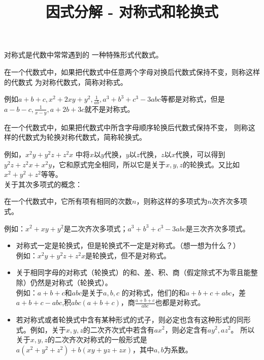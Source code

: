 \documentclass[windows,csize4,answers]{BHCexam}
\title{因式分解 - 对称式和轮换式}
\begin{document}
\maketitle

\begin{groups}
    对称式是代数中常常遇到的 一种特殊形式代数式。\\
    \fbox
    {
        \parbox{\textwidth}
        {
            在一个代数式中，如果把代数式中任意两个字母对换后代数式保持不变，则称这样的代数式
            为对称代数式，简称对称式。
        }
    }
    例如$a+b+c,x^2+2xy+y^2,\frac{1}{ab},a^3+b^3+c^3-3abc$等都是对称式，但是
    $a-b-c,\frac{1}{x-y},a+2b+3c$就不是对称式。 \\

    \fbox
    {
        \parbox{\textwidth}
        {
            在一个代数式中，如果把代数式中所含字母顺序轮换后代数式保持不变，
            则称这样的代数式为轮换对称代数式，简称轮换式。
        }
    }
    例如，$x^2y+y^2z+z^2x$ 中将$x$以$y$代换，$y$以$z$代换，$z$以$x$代换，可以得到
    $y^2z+z^2x+x^2y$，它和原式完全相同，所以它是关于$x,y,z$的轮换式。又比如$x^2+y^2+z^2$等等。 \\

    关于其次多项式的概念： \\
    \fbox
    {
        \parbox{\textwidth}
        {
            在一个代数式中，它所有项有相同的次数$n$，则称这样的多项式为$n$次齐次多项式。
        }
    }
    例如：$x^2+xy+y^2$是二次齐次多项式；$a^3+b^3+c^3-3abc$是三次齐次多项式。


    \begin{itemize}
        \item 对称式一定是轮换式，但是轮换式不一定是对称式。（想一想为什么？）\\
              例如：$x^2y+y^2z+z^2x$是轮换式，但不是对称式。
        \item 关于相同字母的对称式（轮换式）的和、差、积、商（假定除式不为零且能整除）仍然是对称式（轮换式）。\\
              例如：$a+b+c$和$abc$是关于$a,b,c$ 的对称式，他们的和$a+b+c+abc$，差$a+b+c-abc$,积$abc(a+b+c)$，商$\frac{a+b+c}{abc}$也都是对称式。
        \item 若对称式或者轮换式中含有某种形式的式子，则必定也含有这种形式的同形式。例如，关于$x,y,z$的二次齐次式中若含有$ax^2$，则必定含有$ay^2,az^2$。
              所以关于$x,y,z$的二次齐次对称式的一般形式是$a(x^2+y^2+z^2)+b(xy+yz+zx)$，其中$a,b$为系数。
    \end{itemize}


\end{groups}
\end{document}
